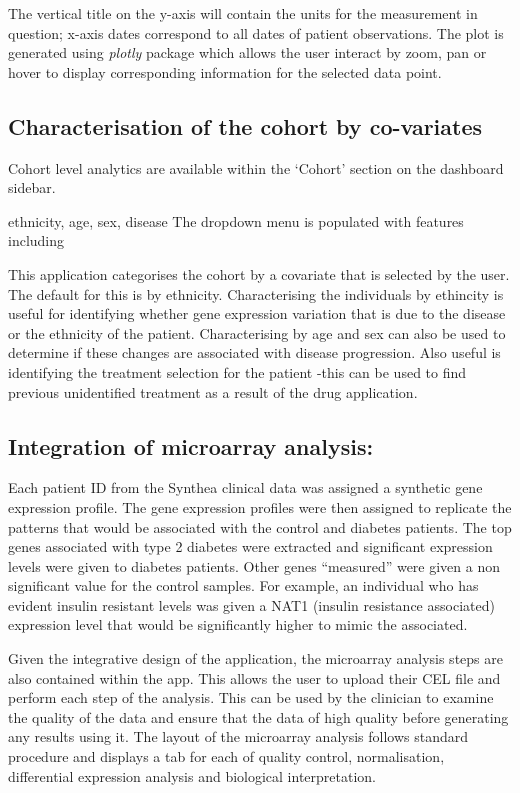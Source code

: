 \documentclass{bioinfo}
\begin{document}
The vertical title on the y-axis will contain the units for the measurement in question; x-axis dates correspond to all dates of patient observations. The plot is generated using \textit{plotly} package which allows the user interact by zoom, pan or hover to display corresponding information for the selected data point.

\subsection{Characterisation of the cohort by co-variates}
Cohort level analytics are available within the `Cohort' section on the dashboard sidebar. 

ethnicity, age, sex, disease
The dropdown menu is populated with features including 

This application categorises the cohort by a covariate that is selected by the user. The default for this is by ethnicity. Characterising the individuals by ethincity is useful for identifying whether gene expression variation that is due to the disease or the ethnicity of the patient. Characterising by age and sex can also be used to determine if these changes are associated with disease progression. Also useful is identifying the treatment selection for the patient -this can be used to find previous unidentified treatment as a result of the drug application.


\subsection{Integration of microarray analysis:}
Each patient ID from the Synthea clinical data was assigned a synthetic gene expression profile. The gene expression profiles were then assigned to replicate the patterns that would be associated with the control and diabetes patients. The top genes associated with type 2 diabetes were extracted and significant expression levels were given to diabetes patients. Other genes “measured” were given a non significant value for the control samples. For example, an individual who has evident insulin resistant levels was given a NAT1 (insulin resistance associated) expression level that would be significantly higher to mimic the associated. 

Given the integrative design of the application, the microarray analysis steps are also contained within the app. This allows the user to upload their CEL file and perform each step of the analysis. This can be used by the clinician to examine the quality of the data and ensure that the data of high quality before generating any results using it. The layout of the microarray analysis follows standard procedure and displays a tab for each of quality control, normalisation, differential expression analysis and biological interpretation. 
\end{document}
